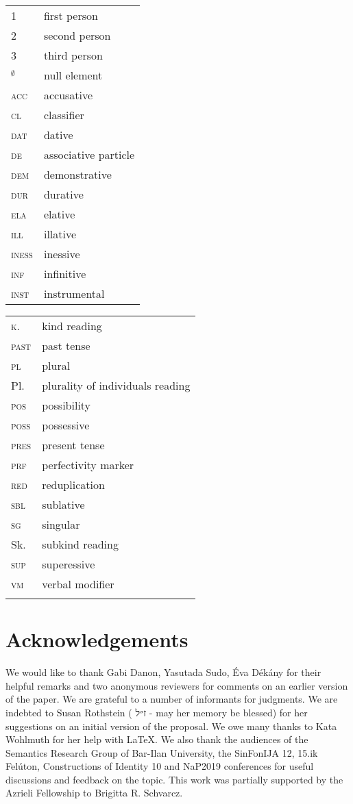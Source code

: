 \documentclass[output=paper]{langscibook}
\begin{document}
\begin{tabularx}{.5\textwidth}{@{}lX@{}}
\textsc{1}&first person\\
\textsc{2}&second person\\
\textsc{3}&third person\\
\textsc{$_{\emptyset}$}&null element\\
\textsc{acc}&accusative\\
\textsc{cl}&classifier\\
\textsc{dat}&dative\\
\textsc{de}&associative particle\\
\textsc{dem}&demonstrative\\
\textsc{dur}&durative\\
\textsc{ela}&elative\\
\textsc{ill}&illative\\
\textsc{iness}&inessive\\
\textsc{inf}&infinitive\\
\textsc{inst}&instrumental\\
\end{tabularx}%
\begin{tabularx}{.5\textwidth}{@{}lX@{}}
\textsc{k.}&kind reading\\
\textsc{past}&{past tense}\\
\textsc{pl}&plural\\
Pl.&plurality of individuals reading\\
\textsc{pos}&possibility\\
\textsc{poss}&possessive\\
\textsc{pres}&present tense\\
\textsc{prf}&perfectivity marker\\
\textsc{red}&reduplication\\
\textsc{sbl}&sublative\\
\textsc{sg}&singular\\
Sk.&subkind reading\\
\textsc{sup}&superessive\\
\textsc{vm}&verbal modifier\\
{}&{}\\
\end{tabularx}

\section*{Acknowledgements}
We would like to thank Gabi Danon, Yasutada Sudo, Éva Dékány for their helpful remarks and two anonymous reviewers for comments on an earlier version of the paper. We are grateful to a number of informants for judgments. We are indebted to Susan Rothstein ( ז״ל - may her memory be blessed) for her suggestions on an initial version of the proposal. We owe many thanks to Kata Wohlmuth for her help with LaTeX. We also thank the audiences of the Semantics Research Group of Bar-Ilan University, the SinFonIJA 12, 15.ik Felúton, Constructions of Identity 10 and NaP2019 conferences for useful discussions and feedback on the topic. This work was partially supported by the Azrieli Fellowship to Brigitta R. Schvarcz. 

{\sloppy\printbibliography[heading=subbibliography,notkeyword=this]}
\end{document}
